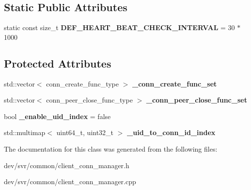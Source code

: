 \subsection*{Static Public Attributes}
\begin{DoxyCompactItemize}
\item 
\hypertarget{classClientConnManager_a096b6d4b948e4ce38b91f6c8943c9451}{
static const size\_\-t {\bfseries DEF\_\-HEART\_\-BEAT\_\-CHECK\_\-INTERVAL} = 30 $\ast$ 1000}
\label{classClientConnManager_a096b6d4b948e4ce38b91f6c8943c9451}

\end{DoxyCompactItemize}
\subsection*{Protected Attributes}
\begin{DoxyCompactItemize}
\item 
\hypertarget{classClientConnManager_a8534819752d2fb02bc43d9639ba9299b}{
std::vector$<$ conn\_\-create\_\-func\_\-type $>$ {\bfseries \_\-conn\_\-create\_\-func\_\-set}}
\label{classClientConnManager_a8534819752d2fb02bc43d9639ba9299b}

\item 
\hypertarget{classClientConnManager_a43214b648067b6f651ddc08e8da5fc2b}{
std::vector$<$ conn\_\-peer\_\-close\_\-func\_\-type $>$ {\bfseries \_\-conn\_\-peer\_\-close\_\-func\_\-set}}
\label{classClientConnManager_a43214b648067b6f651ddc08e8da5fc2b}

\item 
\hypertarget{classClientConnManager_a8a370f9b93ab72ee5b7f6067a895e029}{
bool {\bfseries \_\-enable\_\-uid\_\-index} = false}
\label{classClientConnManager_a8a370f9b93ab72ee5b7f6067a895e029}

\item 
\hypertarget{classClientConnManager_ab23dfaee25fa222d59827bf3787ebcc2}{
std::multimap$<$ uint64\_\-t, uint32\_\-t $>$ {\bfseries \_\-uid\_\-to\_\-conn\_\-id\_\-index}}
\label{classClientConnManager_ab23dfaee25fa222d59827bf3787ebcc2}

\end{DoxyCompactItemize}


The documentation for this class was generated from the following files:\begin{DoxyCompactItemize}
\item 
dev/svr/common/client\_\-conn\_\-manager.h\item 
dev/svr/common/client\_\-conn\_\-manager.cpp\end{DoxyCompactItemize}

